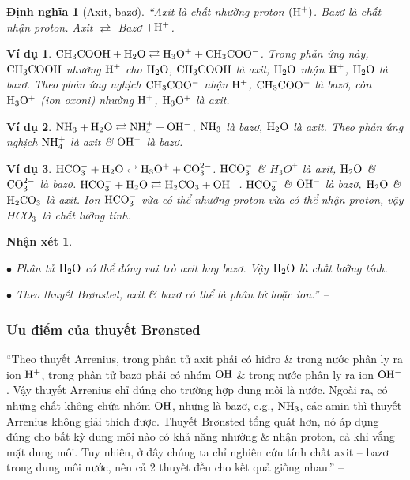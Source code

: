 \documentclass[oneside]{book}
\numberwithin{equation}{section}
\newtheorem{nhanxet}{Nhận xét}[section]
\newtheorem{dinhnghia}{Định nghĩa}[section]
\newtheorem{vidu}{Ví dụ}[section]
\begin{document}
\begin{dinhnghia}[Axit, bazơ]
	``\emph{Axit} là chất nhường proton $(\rm H^+)$. \emph{Bazơ} là chất nhận proton. Axit $\rightleftarrows$ Bazơ $+\rm H^+$.
\end{dinhnghia}

\begin{vidu}
	$\rm CH_3COOH + H_2O\rightleftarrows H_3O^+ + CH_3COO^-$. Trong phản ứng này, $\rm CH_3COOH$ nhường $\rm H^+$ cho $\rm H_2O$, $\rm CH_3COOH$ là axit; $\rm H_2O$ nhận $\rm H^+$, $\rm H_2O$ là bazơ. Theo phản ứng nghịch $\rm CH_3COO^-$ nhận $\rm H^+$, $\rm CH_3COO^-$ là bazơ, còn $\rm H_3O^+$ (ion oxoni) nhường $\rm H^+$, $\rm H_3O^+$ là axit.
\end{vidu}

\begin{vidu}
	$\rm NH_3 + H_2O\rightleftarrows NH_4^+ + OH^-$, $\rm NH_3$ là bazơ, $\rm H_2O$ là axit. Theo phản ứng nghịch $\rm NH_4^+$ là axit \& $\rm OH^-$ là bazơ.
\end{vidu}

\begin{vidu}
	$\rm HCO_3^- + H_2O\rightleftarrows H_3O^+ + CO_3^{2-}$. $\rm HCO_3^-$ \& $H_3O^+$ là axit, $\rm H_2O$ \& $\rm CO_3^{2-}$ là bazơ. $\rm HCO_3^- + H_2O\rightleftarrows H_2CO_3 + OH^-$. $\rm HCO_3^-$ \& $\rm OH^-$ là bazơ, $\rm H_2O$ \& $\rm H_2CO_3$ là axit. Ion $\rm HCO_3^-$ vừa có thể nhường proton vừa có thể nhận proton, vậy $HCO_3^-$ là chất lưỡng tính.
\end{vidu}

\begin{nhanxet}
	\begin{enumerate*}
		\item[$\bullet$] Phân tử $\rm H_2O$ có thể đóng vai trò axit hay bazơ. Vậy $\rm H_2O$ là chất lưỡng tính.
		\item[$\bullet$] Theo thuyết Br\o nsted, axit \& bazơ có thể là phân tử hoặc ion.'' -- \cite[pp. 12--13]{SGK_Hoa_Hoc_11_nang_cao}
	\end{enumerate*}
\end{nhanxet}

\subsubsection{Ưu điểm của thuyết Br\o nsted}
``Theo thuyết Arrenius, trong phân tử axit phải có hiđro \& trong nước phân ly ra ion $\rm H^+$, trong phân tử bazơ phải có nhóm $\rm OH$ \& trong nước phân ly ra ion $\rm OH^-$. Vậy thuyết Arrenius chỉ đúng cho trường hợp dung môi là nước. Ngoài ra, có những chất không chứa nhóm $\rm OH$, nhưng là bazơ, e.g., $\rm NH_3$, các amin thì thuyết Arrenius không giải thích được. Thuyết Br\o nsted tổng quát hơn, nó áp dụng đúng cho bất kỳ dung môi nào có khả năng nhường \& nhận proton, cả khi vắng mặt dung môi. Tuy nhiên, ở đây chúng ta chỉ nghiên cứu tính chất axit -- bazơ trong dung môi nước, nên cả 2 thuyết đều cho kết quả giống nhau.'' -- \cite[p. 13]{SGK_Hoa_Hoc_11_nang_cao}
\end{document}
